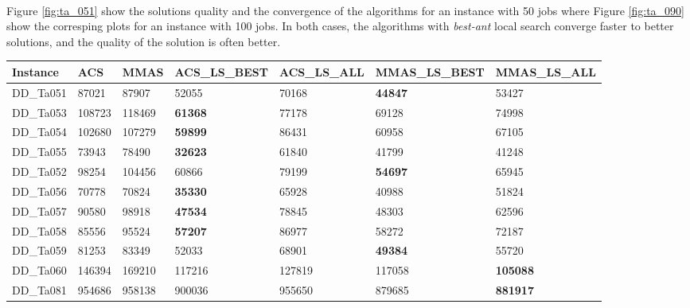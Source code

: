 \documentclass[runningheads]{llncs}
\begin{document}
\paragraph{}

Figure \ref{fig:ta_051} show the solutions quality and the convergence of the algorithms for an instance with 50 jobs where Figure \ref{fig:ta_090} show the corresping plots for an instance with 100 jobs. In both cases, the algorithms with \textit{best-ant} local search converge faster to better solutions, and the quality of the solution is often better.


\begin{table}[H]
  \centering
  \begin{tabular}{|l|l|l|l|l|l|l|}
  \hline
  Instance  & ACS \qquad     & MMAS    & ACS\_LS\_BEST & ACS\_LS\_ALL & MMAS\_LS\_BEST & MMAS\_LS\_ALL \\
  \hline
  DD\_Ta051 & 87021   & 87907   & 52055         & 70168        & \textbf{44847}          & 53427         \\
  \hline
  DD\_Ta053 & 108723  & 118469  & \textbf{61368}         & 77178        & 69128          & 74998         \\
  \hline
  DD\_Ta054 & 102680  & 107279  & \textbf{59899}         & 86431        & 60958          & 67105         \\
  \hline
  DD\_Ta055 & 73943   & 78490   & \textbf{32623}         & 61840        & 41799          & 41248         \\
  \hline
  DD\_Ta052 & 98254   & 104456  & 60866         & 79199        & \textbf{54697}          & 65945         \\
  \hline
  DD\_Ta056 & 70778   & 70824   & \textbf{35330}         & 65928        & 40988          & 51824         \\
  \hline
  DD\_Ta057 & 90580   & 98918   & \textbf{47534}         & 78845        & 48303          & 62596         \\
  \hline
  DD\_Ta058 & 85556   & 95524   & \textbf{57207}         & 86977        & 58272          & 72187         \\
  \hline
  DD\_Ta059 & 81253   & 83349   & 52033         & 68901        & \textbf{49384}          & 55720         \\
  \hline
  DD\_Ta060 & 146394  & 169210  & 117216        & 127819       & 117058         & \textbf{105088}        \\
  \hline
  DD\_Ta081 & 954686  & 958138  & 900036        & 955650       & 879685         & \textbf{881917}        \\

\end{tabular}
\end{table}
\end{document}
